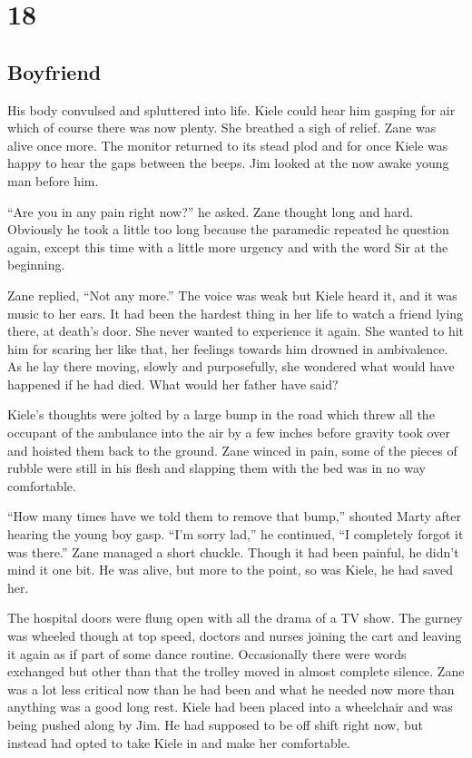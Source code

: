 \chapter{18}
\section{Boyfriend}


His body convulsed and spluttered into life.  Kiele could hear him gasping for air which of course there was now plenty.  She breathed a sigh of relief.  Zane was alive once more.  The monitor returned to its stead plod and for once Kiele was happy to hear the gaps between the beeps.  Jim looked at the now awake young man before him.

``Are you in any pain right now?'' he asked.  Zane thought long and hard.  Obviously he took a little too long because the paramedic repeated he question again, except this time with a little more urgency and with the word Sir at the beginning.  

Zane replied, ``Not any more.''  The voice was weak but Kiele heard it, and it was music to her ears.  It had been the hardest thing in her life to watch a friend lying there, at death's door.  She never wanted to experience it again.  She wanted to hit him for scaring her like that, her feelings towards him drowned in ambivalence.   As he lay there moving, slowly and purposefully, she wondered what would have happened if he had died.  What would her father have said?

Kiele's thoughts were jolted by a large bump in the road which threw all the occupant of the ambulance into the air by a few inches before gravity took over and hoisted them back to the ground.  Zane winced in pain, some of the pieces of rubble were still in his flesh and slapping them with the bed was in no way comfortable.  

``How many times have we told them to remove that bump,'' shouted Marty after hearing the young boy gasp.  ``I'm sorry lad,'' he continued, ``I completely forgot it was there.''  Zane managed a short chuckle.  Though it had been painful, he didn't mind it one bit.  He was alive, but more to the point, so was Kiele, he had saved her.



\thoughtbreak



The hospital doors were flung open with all the drama of a TV show.  The gurney was wheeled though at top speed, doctors and nurses joining the cart and leaving it again as if part of some dance routine.  Occasionally there were words exchanged but other than that the trolley moved in almost complete silence.  Zane was a lot less critical now than he had been and what he needed now more than anything was a good long rest.  Kiele had been placed into a wheelchair and was being pushed along by Jim.  He had supposed to be off shift right now, but instead had opted to take Kiele in and make her comfortable.  

